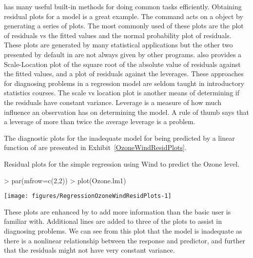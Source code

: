 \R{} has many useful built-in methods for doing common tasks efficiently. Obtaining residual plots for a model is a great example. The  command acts on a  object by generating a series of plots. The most commonly used of these plots are the plot of residuals vs the fitted values and the normal probability plot of residuals. These plots are generated by many statistical applications but the other two presented by default in \R{} are not always given by other programs.
\R{} also provides a Scale-Location plot of the square root of the absolute value of residuals against the fitted values, and a plot of residuals against the leverages. These approaches for diagnosing problems in a regression model are seldom taught in introductory statistics courses. 
The scale vs location plot is another means of determining if the residuals have constant variance. Leverage is a measure of how much influence an observation has on determining the model. A rule of thumb says that a leverage of more than twice the average leverage is a problem.

The diagnostic plots for the inadequate model for  being predicted by a linear function of  are presented in Exhibit~\ref{OzoneWindResidPlots}.
\begin{exhibit}
\begin{center}
\caption{Residual plots for the simple regression using Wind to predict the Ozone level.}
\label{OzoneWindResidPlots}
\begin{Schunk}
\begin{Sinput}
> par(mfrow=c(2,2))
> plot(Ozone.lm1)
\end{Sinput}

\texttt{[image: figures/RegressionOzoneWindResidPlots-1]} \end{Schunk}
\end{center}
\end{exhibit}
These plots are enhanced by \R{} to add more information than the basic user is familiar with. Additional lines are added to three of the plots to assist in diagnosing problems. We can see from this plot that the model is inadequate as there is a nonlinear relationship between the response and predictor, and further that the residuals might not have very constant variance.

